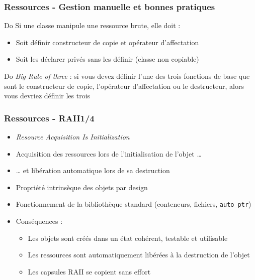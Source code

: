 \documentclass[C++.tex]{subfiles}
\begin{document}
\begin{frame}
	\frametitle{Ressources - Gestion manuelle et bonnes pratiques}
	\begin{exampleblock}{Do}
		Si une classe manipule une ressource brute, elle doit :
		\begin{itemize}
			\item Soit définir constructeur de copie et opérateur d'affectation
			\item Soit les déclarer privés sans les définir (classe non copiable)
		\end{itemize}
	\end{exampleblock}

	\begin{exampleblock}{Do}
		\textit{Big Rule of three} : si vous devez définir l'une des trois fonctions de base que sont le constructeur de copie, l'opérateur d'affectation ou le destructeur, alors vous devriez définir les trois


	\end{exampleblock}

\end{frame}

\begin{frame}
	\frametitle{Ressources - RAII\titlehfill{}1/4}
	\begin{itemize}
		\item \textit{Resource Acquisition Is Initialization}
		\item Acquisition des ressources lors de l'initialisation de l'objet \ldots
		\item \ldots{} et libération automatique lors de sa destruction


		\item Propriété intrinsèque des objets \og par design\fg{}


		\item Fonctionnement de la bibliothèque standard (conteneurs, fichiers, \lstinline|auto_ptr|)
		\item Conséquences :
		\begin{itemize}
			\item Les objets sont créés dans un état cohérent, testable et utilisable
			\item Les ressources sont automatiquement libérées à la destruction de l'objet

			
			\item Les capsules RAII se copient sans effort
		\end{itemize}
	\end{itemize}
\end{frame}
\end{document}
